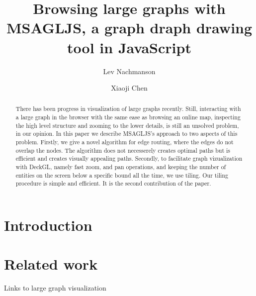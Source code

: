 \documentclass{gd-llncs}
\begin{document}
\title{Browsing large graphs with MSAGLJS, a graph draph drawing tool in JavaScript }
\author{%
  Lev Nachmanson  \and
  Xiaoji Chen
}%
\maketitle


\begin{abstract}
  There has been progress in visualization of large graphs recently. Still, interacting with a large graph in the browser with the same ease as browsing an online map, inspecting the high level structure and zooming to the lower details, is still an unsolved problem, in our opinion. In this paper we describe MSAGLJS's approach to two aspects of this problem. Firstly, we give a novel algorithm for edge routing, where the edges do not overlap the nodes. The algorithm does not necesserely creates optimal paths but is efficient and creates visually appealing paths. Secondly, to facilitate graph vizualization with DeckGL, namely fast zoom, and pan operations, and keeping the number of entities on the screen below a specific bound all the time, we use tiling. Our tiling procedure is simple and efficient. It is the second contribution of the paper.
\end{abstract}


\section*{Introduction}

\label{sec:intro}
\section*{Related work}
Links to large graph visualization


\cite{graphexp}

\cite{graphviz}

\cite{regraph}

\cite{skewed}

\cite{circos}

\cite{gibson2013survey}
\end{document}
